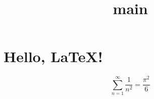 \documentclass{article}
\title{main}
\begin{document}
\section{Hello, \LaTeX!}

$$\sum_{n = 1}^\infty\frac1{n^2} = \frac{\pi^2}{6}$$
\end{document}
